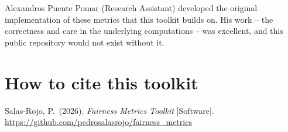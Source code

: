 \documentclass[11pt]{article}
\begin{document}
Alexandros Puente Pomar (Research Assistant) developed the original
implementation of these metrics that this toolkit builds on. His work -- the
correctness and care in the underlying computations -- was excellent, and
this public repository would not exist without it.

\section*{How to cite this toolkit}

Salas-Rojo, P.\ (2026). \emph{Fairness Metrics Toolkit}
[Software]. \url{https://github.com/pedrosalasrojo/fairness_metrics}
\end{document}

